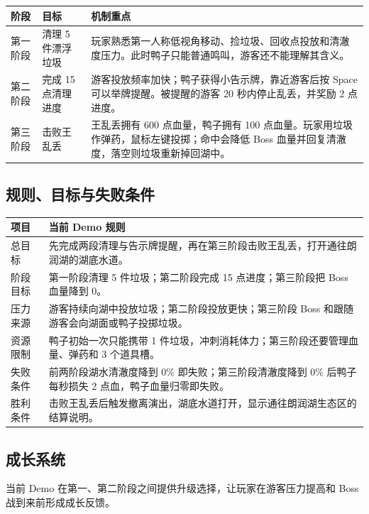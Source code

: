 \documentclass[UTF8,a4paper,12pt]{ctexart}
\begin{document}
\begin{longtable}{p{2.6cm}p{3cm}p{8.2cm}}
\toprule
阶段 & 目标 & 机制重点 \\
\midrule
\endhead
第一阶段 & 清理 5 件漂浮垃圾 & 玩家熟悉第一人称低视角移动、捡垃圾、回收点投放和清澈度压力。此时鸭子只能普通鸣叫，游客还不能理解其含义。 \\
第二阶段 & 完成 15 点清理进度 & 游客投放频率加快；鸭子获得小告示牌，靠近游客后按 Space 可以举牌提醒。被提醒的游客 20 秒内停止乱丢，并奖励 2 点进度。 \\
第三阶段 & 击败王乱丢 & 王乱丢拥有 600 点血量，鸭子拥有 100 点血量。玩家用垃圾作弹药，鼠标左键投掷；命中会降低 Boss 血量并回复清澈度，落空则垃圾重新掉回湖中。 \\
\bottomrule
\end{longtable}

\subsection{规则、目标与失败条件}

\begin{table}[h]
\centering
\begin{tabularx}{\textwidth}{p{3cm}Y}
\toprule
项目 & 当前 Demo 规则 \\
\midrule
总目标 & 先完成两段清理与告示牌提醒，再在第三阶段击败王乱丢，打开通往朗润湖的湖底水道。 \\
阶段目标 & 第一阶段清理 5 件垃圾；第二阶段完成 15 点进度；第三阶段把 Boss 血量降到 0。 \\
压力来源 & 游客持续向湖中投放垃圾；第二阶段投放更快；第三阶段 Boss 和跟随游客会向湖面或鸭子投掷垃圾。 \\
资源限制 & 鸭子初始一次只能携带 1 件垃圾，冲刺消耗体力；第三阶段还要管理血量、弹药和 3 个道具槽。 \\
失败条件 & 前两阶段湖水清澈度降到 0\% 即失败；第三阶段清澈度降到 0\% 后鸭子每秒损失 2 点血，鸭子血量归零即失败。 \\
胜利条件 & 击败王乱丢后触发撤离演出，湖底水道打开，显示通往朗润湖生态区的结算说明。 \\
\bottomrule
\end{tabularx}
\end{table}

\subsection{成长系统}

当前 Demo 在第一、第二阶段之间提供升级选择，让玩家在游客压力提高和 Boss 战到来前形成成长反馈。
\end{document}
